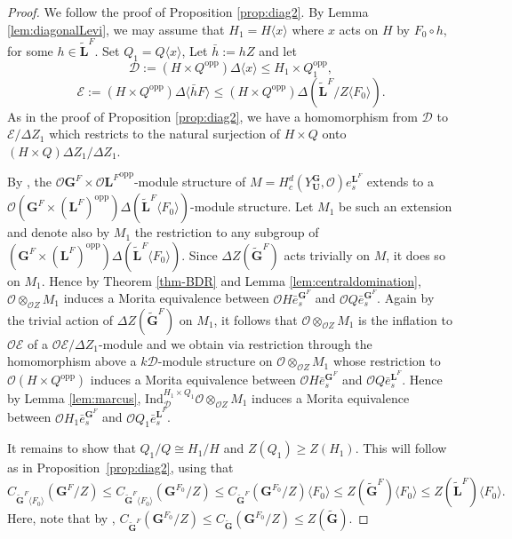 \documentclass{amsart}
\theoremstyle{plain}\newtheorem{Theorem}{Theorem}[section]
\theoremstyle{plain}\newtheorem{Conjecture}[Theorem]{Conjecture}
\theoremstyle{plain}\newtheorem{Corollary}[Theorem]{Corollary}
\theoremstyle{plain}\newtheorem{Lemma}[Theorem]{Lemma}
\theoremstyle{plain}\newtheorem{Proposition}[Theorem]{Proposition}
\theoremstyle{definition}\newtheorem{Definition}[Theorem]{Definition}
\theoremstyle{definition}\newtheorem{Example}[Theorem]{Example}
\theoremstyle{definition}\newtheorem{Examples}[Theorem]{Examples}
\theoremstyle{definition}\newtheorem{Exercise}[Theorem]{Exercise}
\theoremstyle{definition}\newtheorem{Notation}[Theorem]{Notation}
\theoremstyle{definition}\newtheorem{Remark}[Theorem]{Remark}
\theoremstyle{definition}\newtheorem{Remarks}[Theorem]{Remarks}
\def\CD{{\mathcal{D}}} \def\OQ{{\mathcal{O}Q}} \def\OGf{{\mathcal{O}Gf}}
\def\CE{{\mathcal{E}}}  \def\OR{{\mathcal{O}R}}
\def\CO{{\mathcal{O}}}    \def\OPE{{\mathcal{O}(P\rtimes E)}}
\def\Ind{\mathrm{Ind}}    \def\tenC{\otimes_C}
\def\opp{\mathrm{opp}}
\newcommand{\bG}{{\mathbf{G}}}
\newcommand{\bL}{{\mathbf{L}}}
\newcommand{\bU}{{\mathbf{U}}}
\numberwithin{equation}{section}
\begin{document}
\begin{proof}   We follow the  proof of Proposition  \ref{prop:diag2}.
   By Lemma \ref{lem:diagonalLevi},  we may assume that   $H_1 = H \langle  x \rangle   $  where $x$ acts   on $H$ by   $F_0 \circ h $, for some    $  h  \in \tilde \bL^F$.  Set $Q_1 =  Q \langle x \rangle$,
   Let $\bar h:= h Z$   and let   $$\CD :=  (H \times Q^{\opp} ) \Delta \langle x  \rangle\leq  H_1 \times Q_1^{\opp}, $$ $$\CE:= (H\times Q^{\opp} )\Delta  \langle \bar h  F \rangle \leq  (H\times Q^{\opp} )\Delta (\tilde \bL^F/Z \langle F_0\rangle ). $$   As  in  the proof of Proposition  \ref{prop:diag2},    we have a  homomorphism from $\CD$  to  $\CE/\Delta Z_1$   which   restricts to the  natural  surjection  of $H \times Q $ onto $(H \times Q) \Delta Z_1/\Delta Z_1$. 
 
By \cite[Prop.~5.7]{Ru22}, the $\CO \bG^F\times \CO {\bL^F}^{\opp}$-module   structure of  $M=  H_c^d (Y_{\bU}^{\bG}, \CO) e_s^{\bL^F}$ extends to a $\CO (\bG^F \times  (\bL^F)^{\opp})\Delta (\tilde \bL^F \langle F_0\rangle )$-module structure. Let 
$M_1$ be such  an extension  and denote also by $M_1$   the  restriction to any  subgroup of $ (\bG^F \times  (\bL^F)^{\opp})\Delta (\tilde \bL^F \langle F_0\rangle )$.  Since  $  \Delta Z(\tilde \bG^F) $   acts trivially on  $M$, it does so on $M_1$. Hence by  Theorem \ref{thm-BDR}  and  Lemma \ref{lem:centraldomination},  $\CO \otimes_{\CO Z}M_1$  induces a  Morita equivalence between  $\CO H \bar e_s^{\bG^F} $ and  $ \CO Q  \bar  e_s^{\bG^F} $.   Again  by the trivial action of  $\Delta Z(\tilde \bG^F) $ on $M_1$, it follows that   $\CO \otimes_{\CO Z} M_1$ is  the  inflation  to   $\CO \mathcal {E} $  of a  $\CO \mathcal {E}/\Delta Z_1$-module  and we obtain 
via  restriction through the  homomorphism  above  a  $k\CD$-module structure on $\CO \otimes_{\CO Z} M_1$  whose   restriction to    $\CO(H\times Q^{\opp})$  induces a  Morita equivalence between $\CO H \bar  e_{s}^{\bG^F}$  and  $\CO Q\bar e_s^{\bL^F}$. Hence by Lemma \ref{lem:marcus}, $\Ind_{\CD}^{H_1 \times Q_1} \CO \otimes_{\CO Z} M_1$ induces a Morita equivalence between  $\CO H_1 \bar e_{s}^{\bG^F}$  and  $\CO Q_1 \bar e_s^{\bL^F}$.

It remains to  show that   $Q_1/Q \cong  H_1/H$   and  $Z(Q_1) \geq  Z(H_1) $.  This  will   follow  as in Proposition~\ref{prop:diag2}, using that $$C_{\tilde \bG^F \langle F_0 \rangle} (\bG^F/Z)  \leq C_{\tilde \bG^F \langle F_0 \rangle} (\bG^{F_0}/Z) \leq  C_{\tilde \bG^F} (\bG^{F_0}/Z) \langle F_0\rangle \leq   Z(\tilde \bG^F) \langle F_0 \rangle \leq  Z(\tilde \bL^F)  \langle F_0 \rangle.$$  Here, note that by , $C_{\tilde \bG^F} (\bG^{F_0}/Z) \leq  C_{\tilde \bG} (\bG^{F_0}/Z)  \leq  Z(\tilde \bG)$. 
\end{proof} 
\end{document}
